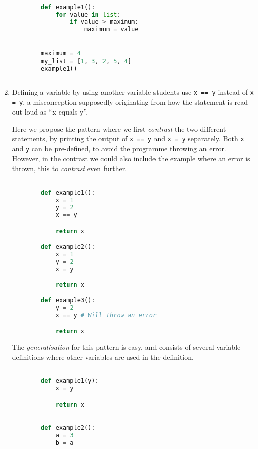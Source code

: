 \begin{enumerate}
      \begin{lstlisting}[language=Python]

        def example1():
            for value in list:
                if value > maximum:
                    maximum = value


        maximum = 4
        my_list = [1, 3, 2, 5, 4]
        example1()
            
    \end{lstlisting}
    \item Defining a variable by using another variable students use 
      \texttt{x == y} instead of \texttt{x = y}, a 
      misconception supposedly originating from how the statement is read 
out 
      loud as \enquote{x equals y}.

      Here we propose the pattern where we first \emph{contrast} the two 
different statements, by printing the output of \texttt{x 
== y} and \texttt{x = y} separately. Both \texttt{x} and \texttt{y} can be pre-defined, to avoid 
the programme throwing an error. However, in the contrast we could 
also include the example where an error is thrown, this to \emph{
contrast} even further. 
      
      \begin{lstlisting}[language=Python]

        def example1():
            x = 1
            y = 2
            x == y

            return x

        def example2():
            x = 1
            y = 2
            x = y
            
            return x

        def example3():
            y = 2
            x == y # Will throw an error

            return x

    \end{lstlisting}
    
      The \emph{generalisation} for this pattern is easy, and consists of 
several variable-definitions where other variables are used in the 
definition. 

      \begin{lstlisting}[language=Python]

        def example1(y):
            x = y

            return x   
            

        def example2():
            a = 3
            b = a


\end{lstlisting}
\end{enumerate}

